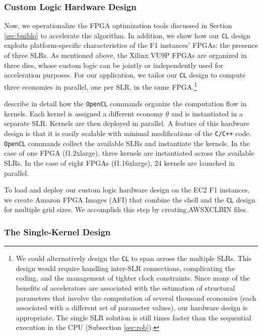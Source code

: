 \documentclass[12pt,american]{article}
\makeatletter
\newcommand{\resultsfolder}{./results}
\newcommand{\devfpgaI}{fpgaI}
\newcommand{\devcpu}{cpu-cores}
\newcommand{\nKMIkI}{nKM4-nk100}
\newcommand{\knlI}{knl-1}
\newcommand{\cpucoreI}{1}
\newcommand{\awsinstfI}{f1.2xlarge\@\xspace}
\newcommand{\awsinstfIII}{f1.16xlarge\@\xspace}
\newcommand{\fpgaspeedIknlICPUI}{}
\makeatother
\begin{document}
\subsubsection{Custom Logic Hardware Design}\label{sec:cusloghardes}

Now, we operationalize the FPGA optimization tools discussed in Section \ref{sec:buiblo} to accelerate the \cite{KrusellSmith1998} algorithm. In addition, we show how our \texttt{CL} design exploits platform-specific characteristics of the F1 instances' FPGAs: the presence of three SLRs. As mentioned above, the Xilinx VU9P FPGAs are organized in three dies, whose custom logic can be jointly or independently used for acceleration purposes. For our application, we tailor our \texttt{CL} design to compute three economies in parallel, one per SLR, in the same FPGA.\footnote{We could alternatively design the \texttt{CL} to span across the multiple SLRs. This design would require handling inter-SLR connections, complicating the coding, and the management of tighter clock constraints. Since many of the benefits of accelerators are associated with the estimation of structural parameters that involve the computation of several thousand economies (each associated with a different set of parameter values), our hardware design is appropriate. The single SLR solution is still \fpgaspeedIknlICPUI times faster than the sequential execution in the CPU (Subsection \ref{sec:rob}).}

\citet{FPGAtutorial23} describe in detail how the \texttt{OpenCL} commands organize the computation flow in kernels. Each kernel is assigned a different economy $\underline{\theta}$ and is instantiated in a separate SLR. Kernels are then deployed in parallel. A feature of this hardware design is that it is easily scalable with minimal modifications of the \texttt{C/C++} code. \texttt{OpenCL} commands collect the available SLRs and instantiate the kernels. In the case of one FPGA (\awsinstfI), three kernels are instantiated across the available SLRs. In the case of eight FPGAs (\awsinstfIII), 24 kernels are launched in parallel.

To load and deploy our custom logic hardware design on the EC2 F1 instances, we create Amazon FPGA Images (AFI) that combine the shell and the \texttt{CL} design for multiple grid sizes. We accomplish this step by creating.AWSXCLBIN files.

\subsubsection{The Single-Kernel Design}\label{sec:kerdes}
\end{document}

